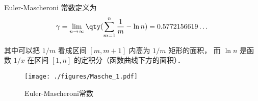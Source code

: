 
\begin{issues}
\issueDraft
\end{issues}


Euler-Mascheroni 常数定义为
\begin{equation}
\gamma = \lim_{n\to\infty} \qty(\sum_{m=1}^n \frac{1}{m} - \ln n) = 0.5772156619\dots
\end{equation}

其中可以把 $1/m$ 看成区间 $[m, m+1]$ 内高为 $1/m$ 矩形的面积， 而 $\ln n$ 是函数 $1/x$ 在区间 $[1,n]$ 的定积分（函数曲线下方的面积）．

\begin{figure}[ht]
\centering
\texttt{[image: ./figures/Masche\_1.pdf]}
\caption{Euler-Mascheroni常数} \label{Masche_fig1}
\end{figure}
